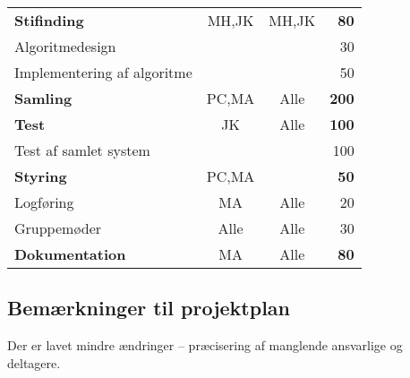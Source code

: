 \begin{center}
\begin{tabular}{l c c r}
	\hspace*{0.3cm} \textbf{Stifinding}							& MH,JK	& MH,JK	& \textbf{80}\\
	\hspace*{0.3cm}\hspace*{0.3cm} Algoritmedesign				&		&		& 30\\
	\hspace*{0.3cm}\hspace*{0.3cm} Implementering af algoritme	&		&		& 50\\
	\hspace*{0.3cm} \textbf{Samling}							& PC,MA	& Alle	& \textbf{200}\\
	\hspace*{0.3cm} \textbf{Test}								& 	JK	& Alle	& \textbf{100}\\
	\hspace*{0.3cm}\hspace*{0.3cm} Test af samlet system		&		&		& 100\\
	\hline
	\textbf{Styring}											& PC,MA	& 		& \textbf{50}\\
	\hspace*{0.3cm} Logføring									& MA	& Alle	& 20\\
	\hspace*{0.3cm} Gruppemøder									& Alle	& Alle	& 30\\
	\hline
	\textbf{Dokumentation}										& MA	& Alle & \textbf{80}
\end{tabular}
\end{center}

\subsection{Bemærkninger til projektplan}
Der er lavet mindre ændringer -- præcisering af manglende ansvarlige og deltagere.